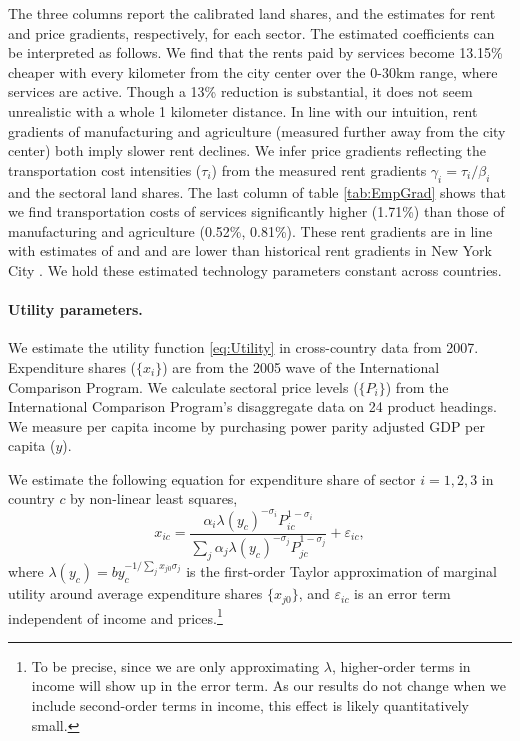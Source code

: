 \documentclass[12pt]{article}
\begin{document}
The three columns report the calibrated land shares, and the estimates for rent and price gradients, respectively, for each sector. The estimated coefficients can be interpreted as follows. We find that the rents paid by services become 13.15\% cheaper with every kilometer from the city center over the 0-30km range, where services are active. Though a 13\% reduction is substantial, it does not seem unrealistic with a whole 1 kilometer distance. In line with our intuition, rent gradients of manufacturing and agriculture (measured further away from the city center) both imply slower rent declines. We infer price gradients reflecting the transportation cost intensities ($\tau_i$) from the measured rent gradients $\gamma_i=\tau_i/\beta_i$ and the sectoral land shares. The last column of table \ref{tab:EmpGrad} shows that we find transportation costs of services significantly higher (1.71\%) than those of manufacturing and agriculture (0.52\%, 0.81\%). These rent gradients are in line with estimates of  and  and are lower than historical rent gradients in New York City \cite{Atack1998}. We hold these estimated technology parameters constant across countries. 

\paragraph{Utility parameters.}
We estimate the utility function \eqref{eq:Utility} in cross-country data from 2007. Expenditure shares ($\{x_i\}$) are from the 2005 wave of the International Comparison Program. We calculate sectoral price levels ($\{P_i\}$) from the International Comparison Program's disaggregate data on 24 product headings. We measure per capita income by purchasing power parity adjusted GDP per capita ($y$).

We estimate the following equation for expenditure share of sector $i=1,2,3$ in country $c$ by non-linear least squares,
\begin{equation}\label{eq:estimable:utility}
	x_{ic} =
	\frac 	{\alpha_i \lambda(y_c)^{-\sigma_i}  P_{ic}^{1-\sigma_i}}
			{\sum_j {\alpha_j \lambda(y_c)^{-\sigma_j}  P_{jc}^{1-\sigma_j}}}
	+ \varepsilon_{ic},
\end{equation}
where $\lambda(y_c) = by_c^{-1/\sum_j x_{j0}\sigma_j}$ is the first-order Taylor approximation of marginal utility around average expenditure shares $\{x_{j0}\}$, and $\varepsilon_{ic}$ is an error term independent of income and prices.\footnote{To be precise, since we are only approximating $\lambda$, higher-order terms in income will show up in the error term. As our results do not change when we include second-order terms in income, this effect is likely quantitatively small.}
\end{document}
